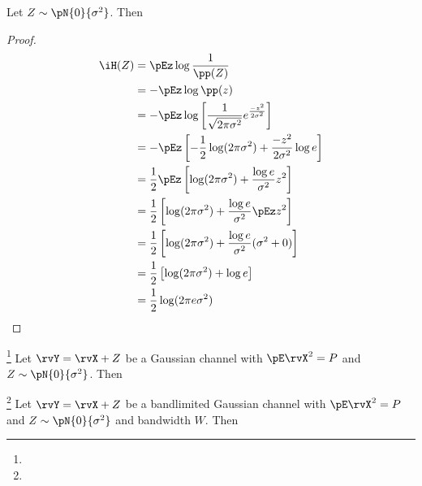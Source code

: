 \begin{theorem}
Let $Z\sim\pN{0}{\sigma^2}$. Then
\end{theorem}
\begin{proof}
\begin{align*}
  \iH(Z)
    &= \pEz \log \frac{1}{\pp(Z)}
  \\&= -\pEz \log \pp(z) 
  \\&= -\pEz
        \log \left[\frac{1}{\sqrt{2\pi\sigma^2}}e^{\frac{-z^2}{2\sigma^2}} \right] 
  \\&= -\pEz \left[
       -\frac{1}{2}\log(2\pi\sigma^2) 
       + \frac{-z^2}{2\sigma^2} \log e 
       \right] 
  \\&= \frac{1}{2} \pEz \left[
       \log(2\pi\sigma^2) 
       + \frac{\log e}{\sigma^2}z^2  
       \right] 
  \\&= \frac{1}{2} \left[
       \log(2\pi\sigma^2) + \frac{\log e}{\sigma^2}\pEz z^2  
       \right] 
  \\&= \frac{1}{2} \left[
       \log(2\pi\sigma^2) + \frac{\log e}{\sigma^2}(\sigma^2+0)
       \right] 
  \\&= \frac{1}{2} \left[
       \log(2\pi\sigma^2) + \log e
       \right] 
  \\&= \frac{1}{2} \log(2\pi e\sigma^2) 
\end{align*}
\end{proof}

\begin{theorem}
\footnote{
  }
Let $\rvY=\rvX+Z$ be a Gaussian channel with $\pE \rvX^2=P$ and
$Z\sim\pN{0}{\sigma^2}$. Then
\end{theorem}

\begin{theorem}
\footnote{
  }
Let $\rvY=\rvX+Z$ be a bandlimited Gaussian channel with $\pE \rvX^2=P$ and
$Z\sim\pN{0}{\sigma^2}$ and bandwidth $W$. Then
\end{theorem}
%




